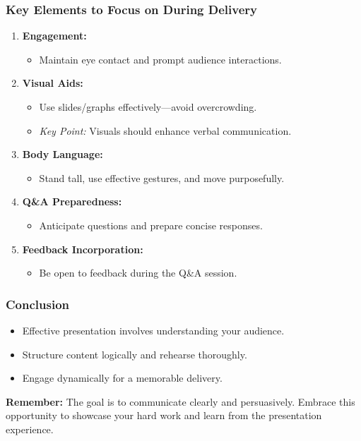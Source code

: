 \documentclass[aspectratio=169]{beamer}
\begin{document}
\begin{frame}[fragile]
  \frametitle{Key Elements to Focus on During Delivery}

  \begin{enumerate}
      \item \textbf{Engagement:}
      \begin{itemize}
          \item Maintain eye contact and prompt audience interactions.
      \end{itemize}

      \item \textbf{Visual Aids:}
      \begin{itemize}
          \item Use slides/graphs effectively—avoid overcrowding.
          \item \textit{Key Point:} Visuals should enhance verbal communication.
      \end{itemize}

      \item \textbf{Body Language:}
      \begin{itemize}
          \item Stand tall, use effective gestures, and move purposefully.
      \end{itemize}

      \item \textbf{Q\&A Preparedness:}
      \begin{itemize}
          \item Anticipate questions and prepare concise responses.
      \end{itemize}

      \item \textbf{Feedback Incorporation:}
      \begin{itemize}
          \item Be open to feedback during the Q\&A session.
      \end{itemize}
  \end{enumerate}
\end{frame}

\begin{frame}[fragile]
  \frametitle{Conclusion}
  \begin{itemize}
      \item Effective presentation involves understanding your audience.
      \item Structure content logically and rehearse thoroughly.
      \item Engage dynamically for a memorable delivery.
  \end{itemize}
  
  \textbf{Remember:} The goal is to communicate clearly and persuasively. Embrace this opportunity to showcase your hard work and learn from the presentation experience.
\end{frame}
\end{document}
